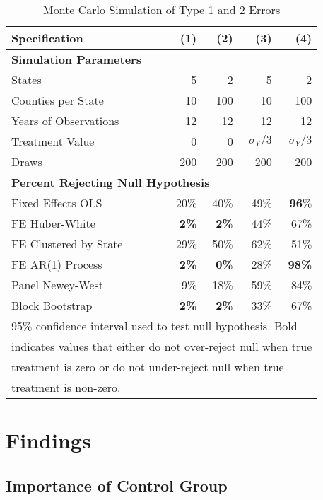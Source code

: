 \documentclass[12pt]{article}
\begin{document}
\begin{table}[H]
	\centering
	\caption{Monte Carlo Simulation of Type 1 and 2 Errors}
	\begin{tabular}{lrrrr} \hline \hline
		Specification &(1) & (2) & (3) & (4)  \\  
		\hline \textbf{Simulation Parameters} & & & & \\
		States &   5 &    2 & 5 & 2\\
		Counties per State &        10 &        100 & 10 & 100\\
		Years of Observations &        12 &        12 & 12 & 12 \\
		Treatment Value &        0 &        0 & $\sigma_{Y}/3$ & $\sigma_{Y}/3$\\
		Draws &       200 & 200 & 200 & 200\\
		\hline \multicolumn{5}{l}{\textbf{Percent Rejecting Null Hypothesis}} \\
		Fixed Effects OLS &      20\% &      40\%& 49\%& \textbf{96}\%\\
		FE Huber-White &       \textbf{2\%} &       \textbf{2\%}& 44\%& 67\%\\
		FE Clustered by State &         29\% &         50\%& 62\% & 51\%\\
		FE AR(1) Process &         \textbf{2\%} &         \textbf{0\%}& 28\%& \textbf{98\%}\\
		Panel Newey-West &         9\% &         18\%& 59\% & 84\%\\
		Block Bootstrap &        \textbf{2\%} &         \textbf{2\%}& 33\%& 67\%\\
		\hline \hline 
		\multicolumn{5}{l}{\footnotesize 95\% confidence interval used to test null hypothesis. Bold  }\\
		\multicolumn{5}{l}{\footnotesize indicates values that either do not over-reject null when true }\\
		\multicolumn{5}{l}{\footnotesize  treatment is zero or do not under-reject null when true  }\\
		\multicolumn{5}{l}{\footnotesize treatment is non-zero. }\\
	\end{tabular}	
	\label{tab:mc}
\end{table}

\section{Findings}
\label{sec:results}

\subsection{Importance of Control Group}
\end{document}
